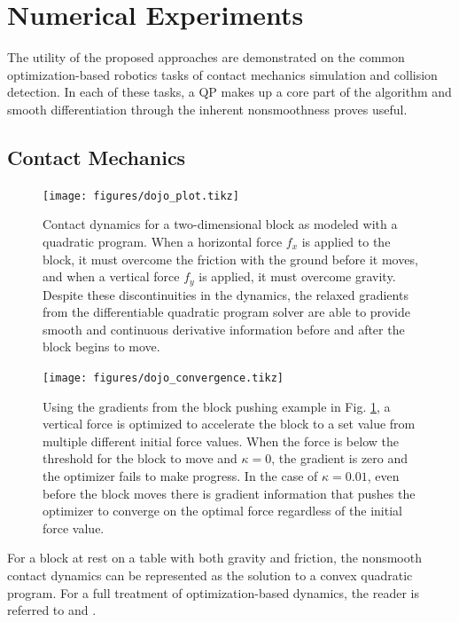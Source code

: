 \section{Numerical Experiments}
The utility of the proposed approaches are demonstrated on the common optimization-based robotics tasks of contact mechanics simulation and collision detection. In each of these tasks, a QP makes up a core part of the algorithm and smooth differentiation through the inherent nonsmoothness proves useful.
\subsection{Contact Mechanics}
    \begin{figure}[t!]
        \centering
        \hspace{1cm}
        \texttt{[image: figures/dojo\_plot.tikz]}
        \caption{Contact dynamics for a two-dimensional block as modeled with a quadratic program. When a horizontal force $f_x$ is applied to the block, it must overcome the friction with the ground before it moves, and when a vertical force $f_y$ is applied, it must overcome gravity. Despite these discontinuities in the dynamics, the relaxed gradients from the differentiable quadratic program solver are able to provide smooth and continuous derivative information before and after the block begins to move.}
        \label{qpax:fig:dojo}
    \end{figure}
    \begin{figure}
        \centering
        \texttt{[image: figures/dojo\_convergence.tikz]}
        \caption{Using the gradients from the block pushing example in Fig. \ref{qpax:fig:dojo}, a vertical force is optimized to accelerate the block to a set value from multiple different initial force values. When the force is below the threshold for the block to move and $\kappa = 0$, the gradient is zero and the optimizer fails to make progress. In the case of $\kappa=0.01$, even before the block moves there is gradient information that pushes the optimizer to converge on the optimal force regardless of the initial force value.}
        \label{qpax:fig:dojo_convergence}
    \end{figure}
For a block at rest on a table with both gravity and friction, the nonsmooth contact dynamics can be represented as the solution to a convex quadratic program. For a full treatment of optimization-based dynamics, the reader is referred to \cite{anitescu2006} and \cite{howell2022}.

